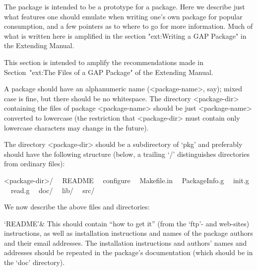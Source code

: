 

The {\Example} package is intended to be a prototype for a package.  Here
we describe just what features one should emulate when writing one's  own
{\GAP} package for popular consumption, and a few pointers as to where to
go for more information. Much of what is written here is amplified in the
section "ext:Writing a GAP Package" in the Extending {\GAP} Manual.


This  section  is  intended  to  amplify  the  recommendations  made   in
Section~"ext:The Files of a GAP Package" of the Extending {\GAP} Manual.

A {\GAP} package should have an alphanumeric name (<package-name>,  say);
mixed case is fine, but there should  be  no  whitespace.  The  directory
<package-dir> containing the files of package  <package-name>  should  be
just  <package-name>  converted  to  lowercase  (the   restriction   that
<package-dir> must contain only lowercase characters may  change  in  the
future).

The directory  <package-dir>  should  be  a  subdirectory  of  `pkg'  and
preferably should have the following structure  (below,  a  trailing  `/'
distinguishes directories from ordinary files):

<package-dir>/
\ \ README
\ \ configure
\ \ Makefile.in
\ \ PackageInfo.g
\ \ init.g
\ \ read.g
\ \ doc/
\ \ lib/
\ \ src/

We now describe the above files and directories:

\beginitems

`README'&
This should contain ``how  to  get  it''  (from  the  {\GAP}  `ftp'-  and
web-sites) instructions, as well as installation instructions  and  names
of the package  authors  and  their  email  addresses.  The  installation
instructions and authors' names and addresses should be repeated  in  the
package's documentation (which should be in the `doc' directory).

